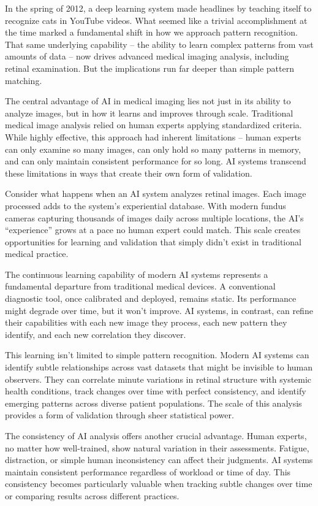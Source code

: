 \documentclass[
  Letterpaper,
]{scrbook}
\begin{document}
In the spring of 2012, a deep learning system made headlines by teaching
itself to recognize cats in YouTube videos. What seemed like a trivial
accomplishment at the time marked a fundamental shift in how we approach
pattern recognition. That same underlying capability -- the ability to
learn complex patterns from vast amounts of data -- now drives advanced
medical imaging analysis, including retinal examination. But the
implications run far deeper than simple pattern matching.

The central advantage of AI in medical imaging lies not just in its
ability to analyze images, but in how it learns and improves through
scale. Traditional medical image analysis relied on human experts
applying standardized criteria. While highly effective, this approach
had inherent limitations -- human experts can only examine so many
images, can only hold so many patterns in memory, and can only maintain
consistent performance for so long. AI systems transcend these
limitations in ways that create their own form of validation.

Consider what happens when an AI system analyzes retinal images. Each
image processed adds to the system's experiential database. With modern
fundus cameras capturing thousands of images daily across multiple
locations, the AI's ``experience'' grows at a pace no human expert could
match. This scale creates opportunities for learning and validation that
simply didn't exist in traditional medical practice.

The continuous learning capability of modern AI systems represents a
fundamental departure from traditional medical devices. A conventional
diagnostic tool, once calibrated and deployed, remains static. Its
performance might degrade over time, but it won't improve. AI systems,
in contrast, can refine their capabilities with each new image they
process, each new pattern they identify, and each new correlation they
discover.

This learning isn't limited to simple pattern recognition. Modern AI
systems can identify subtle relationships across vast datasets that
might be invisible to human observers. They can correlate minute
variations in retinal structure with systemic health conditions, track
changes over time with perfect consistency, and identify emerging
patterns across diverse patient populations. The scale of this analysis
provides a form of validation through sheer statistical power.

The consistency of AI analysis offers another crucial advantage. Human
experts, no matter how well-trained, show natural variation in their
assessments. Fatigue, distraction, or simple human inconsistency can
affect their judgments. AI systems maintain consistent performance
regardless of workload or time of day. This consistency becomes
particularly valuable when tracking subtle changes over time or
comparing results across different practices.
\end{document}
